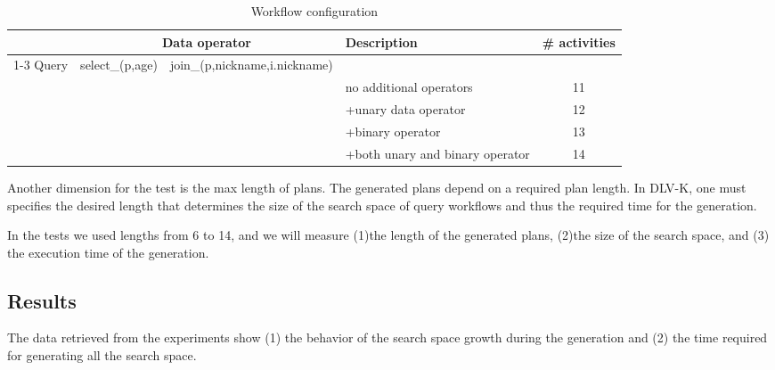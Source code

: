 \documentclass{acm_proc_article-sp}
\begin{document}
	\begin{table*}         	
		\begin{center}
		{\footnotesize
			\begin{tabular}{|c|c|c|l|c|}
				\hline
					  & \multicolumn{2}{c|}{Data operator} & \multirow{3}{*}{Description} & \multirow{3}{*}{\# activities}\\
				\cline{1-3}
				Query & \tiny{select_(p,age)}&\tiny{join_(p,nickname,i.nickname)}& &\\
				\hline
				[Q1]  & \tickNo  & \tickNo & no additional operators& 11 \\
				\hline
				[Q2] & \tickYes & \tickNo & +unary data operator  & 12 \\
				\hline
				[Q3] & \tickNo  & \tickYes & +binary operator  & 13\\
				\hline
				[Q4] & \tickYes & \tickYes & +both unary and binary operator& 14 \\
				\hline
			\end{tabular}
		}
		\end{center}\caption{Workflow configuration} \label{tab:queryConf}
	\end{table*}
	

Another dimension for the test is the max length of plans. The generated plans depend on a required plan length. In DLV-K, one must specifies the desired length that determines the size of the search space of query workflows and thus the required time for the generation.
      
In the tests we used lengths from 6 to 14, and we will measure (1)the length of the generated plans, (2)the size of the search space, and (3) the execution time of the generation.
         
\subsection{Results}

The data retrieved from the experiments show (1) the behavior of the search space growth during the generation and (2) the time required for generating all the search space.  
		
\end{document}

